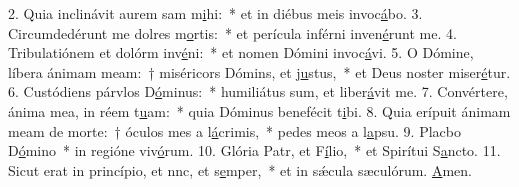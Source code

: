 2. Quia inclinávit aurem sam m\uline{i}hi:~* et in diébus meis invoc\uline{á}bo.
3. Circumdedérunt me dolres m\uline{o}rtis:~* et perícula inférni inven\uline{é}runt me.
4. Tribulatiónem et dolórm inv\uline{é}ni:~* et nomen Dómini invoc\uline{á}vi.
5. O Dómine, líbera ánimam meam:~† miséricors Dómins, et j\uline{u}stus,~* et Deus noster miser\uline{é}tur.
6. Custódiens párvlos D\uline{ó}minus:~* humiliátus sum, et liber\uline{á}vit me.
7. Convértere, ánima mea, in réem t\uline{u}am:~* quia Dóminus benefécit t\uline{i}bi.
8. Quia erípuit ánimam meam de morte:~† óculos mes a l\uline{á}crimis,~* pedes meos a l\uline{a}psu.
9. Placbo D\uline{ó}mino~* in regióne viv\uline{ó}rum.
10. Glória Patr, et F\uline{í}lio,~* et Spirítui S\uline{a}ncto.
11. Sicut erat in princípio, et nnc, et s\uline{e}mper,~* et in sǽcula sæculórum. \uline{A}men.
